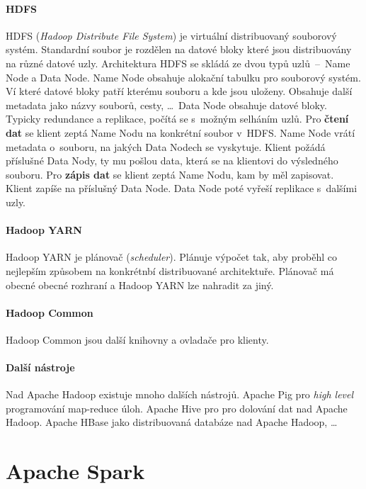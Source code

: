 \paragraph*{HDFS} HDFS (\textit{Hadoop Distribute File System}) je virtuální distribuovaný souborový systém. Standardní soubor je rozdělen na datové bloky které jsou distribuovány na různé datové uzly. Architektura HDFS se skládá ze dvou typů uzlů~--~Name Node a Data Node. Name Node obsahuje alokační tabulku pro souborový systém. Ví které datové bloky patří kterému souboru a kde jsou uloženy. Obsahuje další metadata jako názvy souborů, cesty, \dots \, Data Node obsahuje datové bloky. Typicky redundance a replikace, počítá se s~možným selháním uzlů. Pro \textbf{čtení dat} se klient zeptá Name Nodu na konkrétní soubor v~HDFS. Name Node vrátí metadata o~souboru, na jakých Data Nodech se vyskytuje. Klient požádá příslušné Data Nody, ty mu pošlou data, která se na klientovi  do výsledného souboru. Pro \textbf{zápis dat} se klient zeptá Name Nodu, kam by měl zapisovat. Klient zapíše na příslušný Data Node. Data Node poté vyřeší replikace s~dalšími uzly.

\paragraph*{Hadoop YARN} Hadoop YARN je plánovač (\textit{scheduler}). Plánuje výpočet tak, aby proběhl co nejlepším způsobem na konkrétnbí distribuované architektuře. Plánovač má obecné obecné rozhraní a Hadoop YARN lze nahradit za jiný.

\paragraph*{Hadoop Common} Hadoop Common jsou další knihovny a ovladače pro klienty.

\paragraph*{Další nástroje} Nad Apache Hadoop existuje mnoho dalších nástrojů. Apache Pig pro \textit{high level} programování map-reduce úloh. Apache Hive pro pro dolování dat nad Apache Hadoop. Apache HBase jako distribuovaná databáze nad Apache Hadoop, \dots


\section{Apache Spark}

